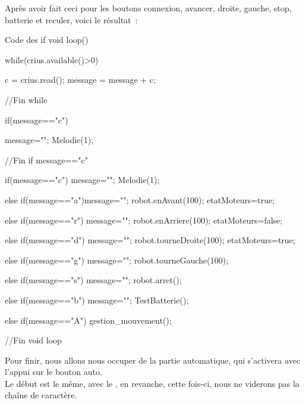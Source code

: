 Après avoir fait ceci pour les boutons connexion, avancer, droite, gauche, stop, batterie et reculer, voici le résultat :


\begin{Cpp}{Code des if}
void loop() {
 
    while(crius.available()>0) {
    
        c = crius.read();
        message = message + c;
    }//Fin while
    
    if(message=="c") {
    
        message="";
        Melodie(1);
    }//Fin if message=="c"

  if(message=="c")  {message=""; 
                    Melodie(1);}
                                
  else if(message=="a"){message="";             
                        robot.enAvant(100);
                        etatMoteurs=true;}
                                
  else if(message=="r")   {message="";
                           robot.enArriere(100);
                           etatMoteurs=false;}  
                                                      
  else if(message=="d")   {message="";            
                           robot.tourneDroite(100);
                           etatMoteurs=true;}
                                
  else if(message=="g")    {message="";           
                            robot.tourneGauche(100);} 
                                
  else if(message=="s") {message="";          
                              robot.arret();}
                                
  else if(message=="b")  {message="";              
                          TestBatterie();}        
                                                           
  else if(message=="A")  {gestion_mouvement();}   
  
  }//Fin void loop
\end{Cpp}

Pour finir, nous allons nous occuper de la partie automatique, qui s'activera avec l'appui sur le bouton auto. \\
Le début est le même, avec le , en revanche, cette fois-ci, nous ne viderons pas la chaîne de caractère.

